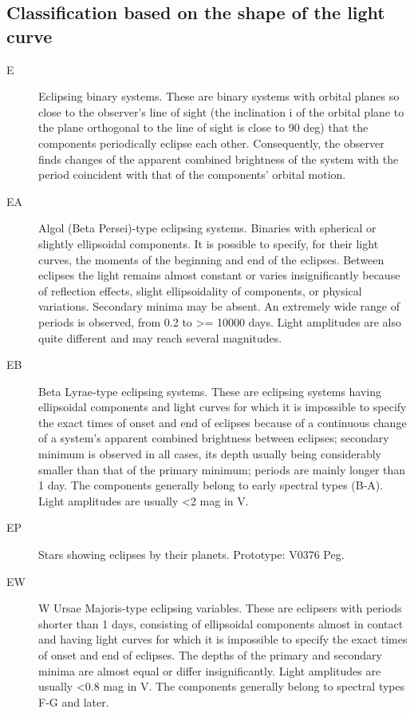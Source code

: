 \subsection{Classification based on the shape of the light curve}
\begin{description}
    \item[E]   Eclipsing binary systems. These are binary systems with orbital planes so close to the observer's line of sight (the inclination i of the orbital plane to the plane orthogonal to the line of sight is close to 90 deg) that the components periodically eclipse each other. Consequently, the observer finds changes of the apparent combined brightness of the system with the period coincident with that of the components' orbital motion.

    \item[EA]   Algol (Beta Persei)-type eclipsing systems. Binaries with spherical or slightly ellipsoidal components. It is possible to specify, for their light curves, the moments of the beginning and end of the eclipses. Between eclipses the light remains almost constant or varies insignificantly because of reflection effects, slight ellipsoidality of components, or physical variations. Secondary minima may be absent. An extremely wide range of periods is observed, from 0.2 to >= 10000 days. Light amplitudes are also quite different and may reach several magnitudes.

    \item[EB]   Beta Lyrae-type eclipsing systems. These are eclipsing systems having ellipsoidal components and light curves for which it is impossible to specify the exact times of onset and end of eclipses because of a continuous change of a system's apparent combined brightness between eclipses; secondary minimum is observed in all cases, its depth usually being considerably smaller than that of the primary minimum; periods are mainly longer than 1 day. The components generally belong to early spectral types (B-A). Light amplitudes are usually <2 mag in V.

    \item[EP]    Stars showing eclipses by their planets. Prototype: V0376 Peg.

    \item[EW]   W Ursae Majoris-type eclipsing variables. These are eclipsers with periods shorter than 1 days, consisting of ellipsoidal components almost in contact and having light curves for which it is impossible to specify the exact times of onset and end of eclipses. The depths of the primary and secondary minima are almost equal or differ insignificantly. Light amplitudes are usually <0.8 mag in V. The components generally belong to spectral types F-G and later.
\end{description}

